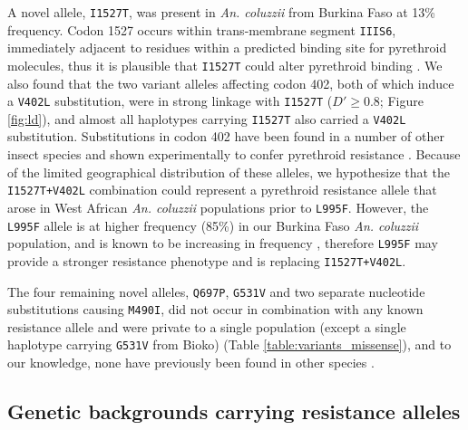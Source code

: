\documentclass[a4paper,11pt,abstracton,hidelinks]{scrartcl}
\begin{document}
%
A novel allele, \texttt{I1527T}, was present in \textit{An. coluzzii} from Burkina Faso at 13\% frequency.
%
Codon 1527 occurs within trans-membrane segment \texttt{IIIS6}, immediately adjacent to residues within a predicted binding site for pyrethroid molecules, thus it is plausible that \texttt{I1527T} could alter pyrethroid binding \cite{Du2013,Dong2014}.
%
We also found that the two variant alleles affecting codon 402, both of which induce a \texttt{V402L} substitution, were in strong linkage with \texttt{I1527T} ($D' \geq 0.8$; Figure \ref{fig:ld}), and almost all haplotypes carrying \texttt{I1527T} also carried a \texttt{V402L} substitution.
%
Substitutions in codon 402 have been found in a number of other insect species and shown experimentally to confer pyrethroid resistance \cite{Dong2014}.
%
Because of the limited geographical distribution of these alleles, we hypothesize that the \texttt{I1527T+V402L} combination could represent a pyrethroid resistance allele that arose in West African \textit{An. coluzzii} populations prior to \texttt{L995F}.
%
However, the \texttt{L995F} allele is at higher frequency (85\%) in our Burkina Faso \textit{An. coluzzii} population, and is known to be increasing in frequency \cite{Toe2014}, therefore \texttt{L995F} may provide a stronger resistance phenotype and is replacing \texttt{I1527T+V402L}.


%
The four remaining novel alleles, \texttt{Q697P}, \texttt{G531V} and two separate nucleotide substitutions causing \texttt{M490I}, did not occur in combination with any known resistance allele and were private to a single population (except a single haplotype carrying \texttt{G531V} from Bioko) (Table \ref{table:variants_missense}), and to
 our knowledge, none have previously been found in other species \cite{Rinkevich2013, Dong2014}.


\subsection*{Genetic backgrounds carrying resistance alleles}
\end{document}
